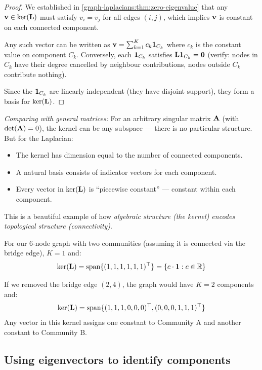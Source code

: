 \begin{notechapter}
\begin{proof}
We established in \cref{graph-laplacians:thm:zero-eigenvalue} that any $\mathbf{v} \in \ker(\mathbf{L})$ must satisfy $v_i = v_j$ for all edges $(i,j)$, which implies $\mathbf{v}$ is constant on each connected component.

Any such vector can be written as $\mathbf{v} = \sum_{k=1}^{K} c_k \mathbf{1}_{C_k}$ where $c_k$ is the constant value on component $C_k$. Conversely, each $\mathbf{1}_{C_k}$ satisfies $\mathbf{L} \mathbf{1}_{C_k} = \mathbf{0}$ (verify: nodes in $C_k$ have their degree cancelled by neighbour contributions, nodes outside $C_k$ contribute nothing).

Since the $\mathbf{1}_{C_k}$ are linearly independent (they have disjoint support), they form a basis for $\ker(\mathbf{L})$.
\end{proof}

\begin{keyidea}
\emph{Comparing with general matrices:} For an arbitrary singular matrix $\mathbf{A}$ (with $\det(\mathbf{A}) = 0$), the kernel can be any subspace --- there is no particular structure. But for the Laplacian:
\begin{itemize}
    \item The kernel has dimension equal to the number of connected components.
    \item A natural basis consists of indicator vectors for each component.
    \item Every vector in $\ker(\mathbf{L})$ is ``piecewise constant'' --- constant within each component.
\end{itemize}

This is a beautiful example of how \emph{algebraic structure (the kernel) encodes topological structure (connectivity)}.
\end{keyidea}

\begin{example}
For our 6-node graph with two communities (assuming it is connected via the bridge edge), $K = 1$ and:
\[
\ker(\mathbf{L}) = \mathrm{span}\{(1, 1, 1, 1, 1, 1)^\top\} = \{c \cdot \mathbf{1} : c \in \mathbb{R}\}
\]

If we removed the bridge edge $(2,4)$, the graph would have $K = 2$ components and:
\[
\ker(\mathbf{L}) = \mathrm{span}\{(1,1,1,0,0,0)^\top, (0,0,0,1,1,1)^\top\}
\]
Any vector in this kernel assigns one constant to Community A and another constant to Community B.
\end{example}

\subsection{Using eigenvectors to identify components}


\end{notechapter}
